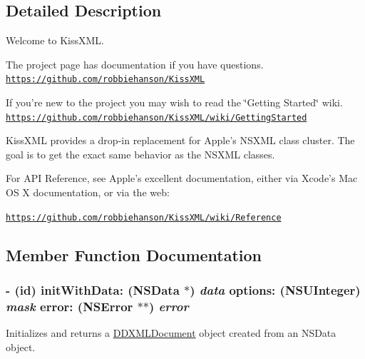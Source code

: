 \subsection{Detailed Description}
Welcome to KissXML.

The project page has documentation if you have questions. \href{https://github.com/robbiehanson/KissXML}{\tt https://github.com/robbiehanson/KissXML}

If you're new to the project you may wish to read the \char`\"{}Getting Started\char`\"{} wiki. \href{https://github.com/robbiehanson/KissXML/wiki/GettingStarted}{\tt https://github.com/robbiehanson/KissXML/wiki/GettingStarted}

KissXML provides a drop-\/in replacement for Apple's NSXML class cluster. The goal is to get the exact same behavior as the NSXML classes.

For API Reference, see Apple's excellent documentation, either via Xcode's Mac OS X documentation, or via the web:

\href{https://github.com/robbiehanson/KissXML/wiki/Reference}{\tt https://github.com/robbiehanson/KissXML/wiki/Reference} 

\subsection{Member Function Documentation}
\hypertarget{interface_d_d_x_m_l_document_aad220c293e97e2f9d4606445672e0ff4}{
\subsubsection[{initWithData:options:error:}]{\setlength{\rightskip}{0pt plus 5cm}-\/ (id) initWithData: (NSData $\ast$) {\em data}\/ options: (NSUInteger) {\em mask}\/ error: (NSError $\ast$$\ast$) {\em error}}}
\label{interface_d_d_x_m_l_document_aad220c293e97e2f9d4606445672e0ff4}
Initializes and returns a \hyperlink{interface_d_d_x_m_l_document}{DDXMLDocument} object created from an NSData object.

